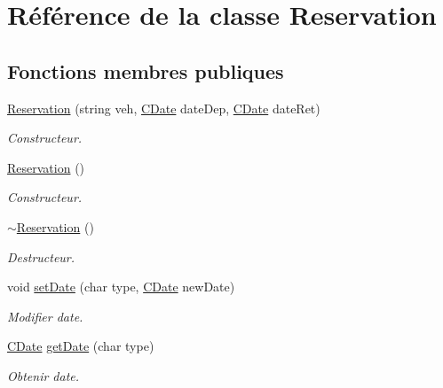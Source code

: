 \hypertarget{class_reservation}{
\section{Référence de la classe Reservation}
\label{class_reservation}
}
\subsection*{Fonctions membres publiques}
\begin{DoxyCompactItemize}
\item 
\hyperlink{class_reservation_ac7957aefcd95b0f9a36fa07f377a1072}{Reservation} (string veh, \hyperlink{class_c_date}{CDate} dateDep, \hyperlink{class_c_date}{CDate} dateRet)
\begin{DoxyCompactList}\small\item\em Constructeur. \item\end{DoxyCompactList}\item 
\hyperlink{class_reservation_a63b283053695e6f50fa44c50da2b3de5}{Reservation} ()
\begin{DoxyCompactList}\small\item\em Constructeur. \item\end{DoxyCompactList}\item 
\hyperlink{class_reservation_abf387b06b84f8a12c8e2e95d431d3d60}{$\sim$Reservation} ()
\begin{DoxyCompactList}\small\item\em Destructeur. \item\end{DoxyCompactList}\item 
void \hyperlink{class_reservation_ac72f95402ed4b92c2625ac8b546e95d0}{setDate} (char type, \hyperlink{class_c_date}{CDate} newDate)
\begin{DoxyCompactList}\small\item\em Modifier date. \item\end{DoxyCompactList}\item 
\hyperlink{class_c_date}{CDate} \hyperlink{class_reservation_ab03159e8f06b63e5dcd2f10ec637f1f8}{getDate} (char type)
\begin{DoxyCompactList}\small\item\em Obtenir date. \item\end{DoxyCompactList}\item 

\end{DoxyCompactItemize}
